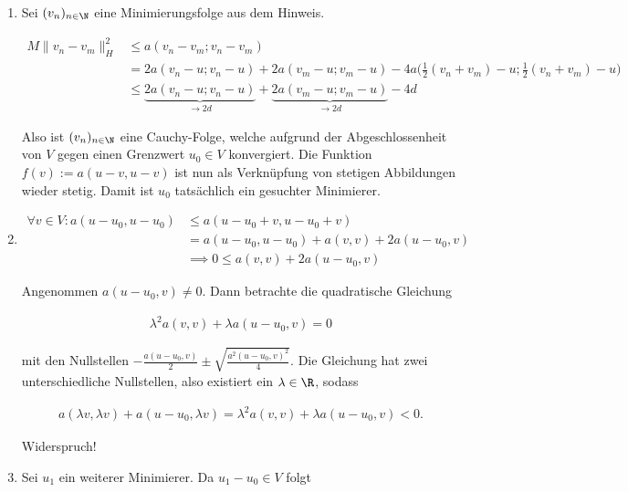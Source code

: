 \begin{solution}

\begin{enumerate}[label = \textbf{\alph*)}]

  \item Sei $(v_n)_{n\in\N}$ eine Minimierungsfolge aus dem Hinweis.

  \begin{align*}
    M\|v_n - v_m\|_H^2 &\leq
    a(v_n - v_m ; v_n - v_m ) \\
    &=
    2a(v_n - u; v_n - u) + 2a(v_m - u; v_m - u) -
    4a\Bigg(\frac{1}{2}(v_n + v_m ) - u;\frac{1}{2}(v_n + v_m )- u\Bigg) \\
    &\leq \underbrace{2a(v_n - u; v_n - u)}_{\to 2d} + \underbrace{2a(v_m - u; v_m - u)}_{\to 2d} - 4d
  \end{align*}

  Also ist $(v_n)_{n \in \N}$ eine Cauchy-Folge, welche aufgrund der Abgeschlossenheit von $V$ gegen einen Grenzwert $u_0 \in V$ konvergiert.
  Die Funktion $f(v) := a(u-v,u-v)$ ist nun als Verknüpfung von stetigen Abbildungen wieder stetig.
  Damit ist $u_0$ tatsächlich ein gesuchter Minimierer.

  \item

  \begin{align*}
    \forall v \in V: a(u - u_0, u - u_0) &\leq a(u - u_0 + v, u - u_0 + v) \\
    &= a(u - u_0, u - u_0) + a(v,v) + 2a(u - u_0, v) \\
    &\implies 0 \leq a(v,v) + 2a(u - u_0, v)
  \end{align*}

  Angenommen $a(u - u_0, v) \neq 0$.
  Dann betrachte die quadratische Gleichung

  \begin{align*}
    \lambda^2 a(v,v) + \lambda a(u-u_0,v) = 0
  \end{align*}

  mit den Nullstellen $-\frac{a(u-u_0,v)}{2} \pm \sqrt{\frac{a^2(u-u_0,v)^2}{4}}$.
  Die Gleichung hat zwei unterschiedliche Nullstellen, also existiert ein $\lambda \in \R$, sodass

  \begin{align*}
    a(\lambda v, \lambda v) + a(u-u_0,\lambda v) = \lambda^2 a(v,v) + \lambda a(u-u_0,v) < 0.
  \end{align*}

  Widerspruch!

  \item Sei $u_1$ ein weiterer Minimierer.
  Da $u_1 - u_0 \in V$ folgt
  

\end{enumerate}
\end{solution}
